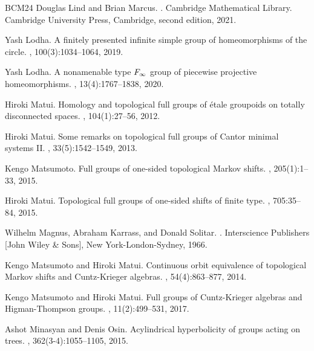 \documentclass[11pt,letterpaper]{amsart}
\theoremstyle{definition}
\begin{document}
\begin{thebibliography}{BCM{\etalchar{+}}24}
Douglas Lind and Brian Marcus.
.
\newblock Cambridge Mathematical Library. Cambridge University Press,
  Cambridge, second edition, 2021.

Yash Lodha.
\newblock A finitely presented infinite simple group of homeomorphisms of the
  circle.
, 100(3):1034--1064, 2019.

Yash Lodha.
\newblock A nonamenable type {$\rm F_\infty$} group of piecewise projective
  homeomorphisms.
, 13(4):1767--1838, 2020.

Hiroki Matui.
\newblock Homology and topological full groups of \'{e}tale groupoids on
  totally disconnected spaces.
, 104(1):27--56, 2012.

Hiroki Matui.
\newblock Some remarks on topological full groups of {C}antor minimal systems
  {II}.
, 33(5):1542--1549, 2013.

Kengo Matsumoto.
\newblock Full groups of one-sided topological {M}arkov shifts.
, 205(1):1--33, 2015.

Hiroki Matui.
\newblock Topological full groups of one-sided shifts of finite type.
, 705:35--84, 2015.

Wilhelm Magnus, Abraham Karrass, and Donald Solitar.
.
\newblock Interscience Publishers [John Wiley \& Sons], New York-London-Sydney,
  1966.

Kengo Matsumoto and Hiroki Matui.
\newblock Continuous orbit equivalence of topological {M}arkov shifts and
  {C}untz-{K}rieger algebras.
, 54(4):863--877, 2014.

Kengo Matsumoto and Hiroki Matui.
\newblock Full groups of {C}untz-{K}rieger algebras and {H}igman-{T}hompson
  groups.
, 11(2):499--531, 2017.

Ashot Minasyan and Denis Osin.
\newblock Acylindrical hyperbolicity of groups acting on trees.
, 362(3-4):1055--1105, 2015.


\end{thebibliography}
\end{document}
